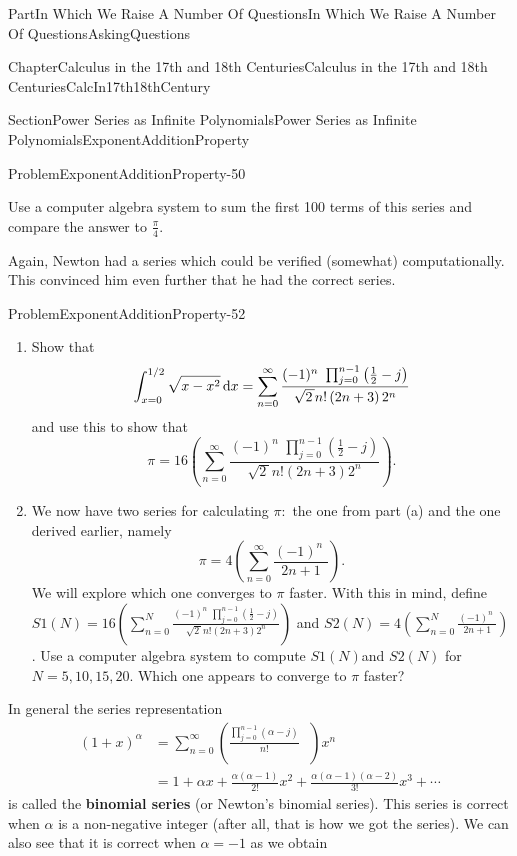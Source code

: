 \documentclass[oneside,10pt,]{book}
\newcommand{\terminology}[1]{\textbf{#1}}
\numberwithin{equation}{part}
\newcommand{\dx}[1]{\,{\rm d}#1}
\newcommand{\amp}{&}
\begin{document}
\begin{partptx}{Part}{In Which We Raise A Number Of Questions}{}{In Which We Raise A Number Of Questions}{}{}{AskingQuestions}
\begin{chapterptx}{Chapter}{Calculus in the 17th and 18th Centuries}{}{Calculus in the 17th and 18th Centuries}{}{}{CalcIn17th18thCentury}
\begin{sectionptx}{Section}{Power Series as Infinite Polynomials}{}{Power Series as Infinite Polynomials}{}{}{ExponentAdditionProperty}
\begin{problem}{Problem}{}{ExponentAdditionProperty-50}
%
\par
Use a computer algebra system to sum the first 100 terms of this series and compare the answer to \(\frac{\pi}{4}\).%
\end{problem}
Again, Newton had a series which could be verified (somewhat) computationally.  This convinced him even further that he had the correct series.%
\begin{problem}{Problem}{}{ExponentAdditionProperty-52}%
%
\begin{enumerate}[label={(\alph*)}]
\item{}Show that%
\begin{equation*}
\int_{x=0}^{1/2}\sqrt{x-x^2}\dx{ x}=\sum_{n=0}^\infty\frac{(-1)^n\,\,\prod_{j=0}^{n-1}\left(\frac{1}{2}-j\right)}{\sqrt{2\,}n!\left(2n+3\right)2^n}
\end{equation*}
and use this to show that%
\begin{equation*}
\pi=16\left(\sum_{n=0}^\infty\frac{(-1)^n\,\,\prod_{j=0}^{n-1}\left(\frac{1}{2}-j\right)}{\sqrt{2\,}n!\left(2n+3\right)2^n}\right)\text{.}
\end{equation*}
%
\item{}We now have two series for calculating \(\pi:\) the one from part (a) and the one derived earlier, namely%
\begin{equation*}
\pi=4\left(\sum_{n=0}^\infty\frac{(-1)^n\,\,}{2n+1}\right)\text{.}
\end{equation*}
We will explore which one converges to \(\pi\) faster.  With this in mind, define \(S1(N)=16\left(\sum_{n=0}^N\frac{(-1)^n\,\,\prod_{j=0}^{n-1}\left(
\frac{1}{2}-j\right)}{\sqrt{2\,}n!\left(2n+3\right)2^n}\right)\) and \(S2(N)=4\left(\sum_{n=0}^N\frac{(-1)^n\,\,}{2n+1}\right)\). Use a computer algebra system to compute \(S1(N)\)and \(S2(N)\) for \(N=5,10,15,20\).  Which one appears to converge to \(\pi\) faster?%
\end{enumerate}
%
\end{problem}
In general the series representation%
\begin{align*}
\left(1+x\right)^\alpha \amp  =\sum_{n=0}^\infty\left(\frac{\prod_{j=0}^{n-1}\left(\alpha-j\right)}{n!}\text{ } \right)x^n\\
\amp =1+\alpha x+\frac{\alpha\left(\alpha-1\right)}{2!}x^2+\frac{\alpha\left(\alpha-1\right)\left(\alpha-2\right)}{3!}x^3+\cdots
\end{align*}
is called the \terminology{binomial series} (or Newton's binomial series).  This series is correct when \(\alpha\) is a non-negative integer (after all, that is how we got the series).  We can also see that it is correct when \(\alpha=-1\) as we obtain%

\end{sectionptx}
\end{chapterptx}
\end{partptx}
\end{document}

